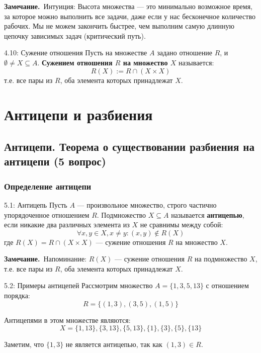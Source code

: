 \documentclass[a4paper,12pt]{article}
\newcommand{\myremark}{\textbf{Замечание.}\ }
\begin{document}
	\myremark{Интуиция:} Высота множества — это минимально возможное время, за которое можно выполнить все задачи, даже если у нас бесконечное количество рабочих. Мы не можем закончить быстрее, чем выполним самую длинную цепочку зависимых задач (критический путь).
	
	\begin{definitionbox}{4.10: Сужение отношения}
		Пусть на множестве $A$ задано отношение $R$, и $\emptyset \neq X \subseteq A$. 
		\textbf{Сужением отношения $R$ на множество $X$} называется:
		\[ R(X) := R \cap (X \times X) \]
		т.е. все пары из $R$, оба элемента которых принадлежат $X$.
	\end{definitionbox}
	
	
	
	
	
	
	
	
	
	
	\newpage
	\section{Антицепи и разбиения}
	
	\subsection{Антицепи. Теорема о существовании разбиения на антицепи (5 вопрос)}
	
	\subsubsection{Определение антицепи}
	
	\begin{definitionbox}{5.1: Антицепь}
		Пусть $A$ — произвольное множество, строго частично упорядоченное отношением $R$. 
		Подмножество $X \subseteq A$ называется \textbf{антицепью}, если никакие два различных элемента из $X$ не сравнимы между собой:
		\[ \forall x, y \in X, x \neq y: (x, y) \notin R(X) \]
		где $R(X) = R \cap (X \times X)$ — сужение отношения $R$ на множество $X$.
	\end{definitionbox}
	
	\myremark{Напоминание:} $R(X)$ — сужение отношения $R$ на подмножество $X$, т.е. все пары из $R$, оба элемента которых принадлежат $X$.
	
	\begin{examplebox}{5.2: Примеры антицепей}
		Рассмотрим множество $A = \{1, 3, 5, 13\}$ с отношением порядка:
		\[ R = \{(1, 3), (3, 5), (1, 5)\} \]
		
		Антицепями в этом множестве являются:
		\[ X = \{1, 13\}, \{3, 13\}, \{5, 13\}, \{1\}, \{3\}, \{5\}, \{13\} \]
		
		Заметим, что $\{1, 3\}$ не является антицепью, так как $(1,3) \in R$.
	\end{examplebox}
	
\end{document}
